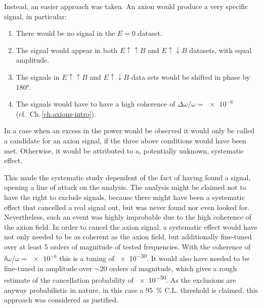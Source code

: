 Instead, an easier approach was taken. An axion would produce a very specific signal, in particular:
\begin{enumerate}
  \item There would be no signal in the $E=0$ dataset.
  \item The signal would appear in both $E \uparrow \uparrow B$ and $E \uparrow \downarrow B$ datasets, with equal amplitude.
  \item The signals in $E \uparrow \uparrow B$ and $E \uparrow \downarrow B$ data sets would be shifted in phase by \ang{180}.
  \item The signals would have to have a high coherence of $\Delta \omega / \omega = \num{e-6}$ (cf.\ Ch.\,\ref{ch:axions-intro}).
\end{enumerate}
In a case when an excess in the power would be observed it would only be called a candidate for an axion signal, if the three above conditions would have been met. Otherwise, it would be attributed to a, potentially unknown, systematic effect.

This made the systematic study dependent of the fact of having found a signal, opening a line of attack on the analysis. The analysis might be claimed not to have the right to exclude signals, because there might have been a systematic effect that cancelled a real signal out, but was never found nor even looked for. Nevertheless, such an event was highly improbable due to the high coherence of the axion field. In order to cancel the axion signal, a systematic effect would have not only needed to be as coherent as the axion field, but additionally fine-tuned over at least 5 orders of magnitude of tested frequencies. With the coherence of $\delta \omega / \omega = \num{e-6}$ this is a tuning of \num{e-30}. It would also have needed to be fine-tuned in amplitude over $\sim 20$ orders of magnitude, which gives a rough estimate of the cancellation probability of \num{e-50}. As the exclusions are anyway probabilistic in nature, in this case a \SI{95}{\percent} C.L. threshold is claimed, this approach was considered as justified.




